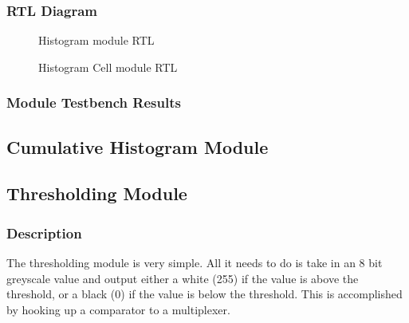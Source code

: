 \documentclass[12pt]{article}
\begin{document}
  \subsubsection{RTL Diagram}
  \begin{figure}[H]
    \caption{Histogram module RTL}
    \label{fig:histogram_rtl}
  \end{figure}
  
  \begin{figure}[H]
    \caption{Histogram Cell module RTL}
    \label{fig:histogram_cell_rtl}
  \end{figure}
  
  
  \subsubsection{Module Testbench Results}
  
  \subsection{Cumulative Histogram Module}
  
  \subsection{Thresholding Module}
  \subsubsection{Description}
  The thresholding module is very simple. All it needs to do is take in an 8 bit greyscale value and output either a white (255) if the value is above the threshold, or a black (0) if the value is below the threshold. This is accomplished by hooking up a comparator to a multiplexer.
  
\end{document}
